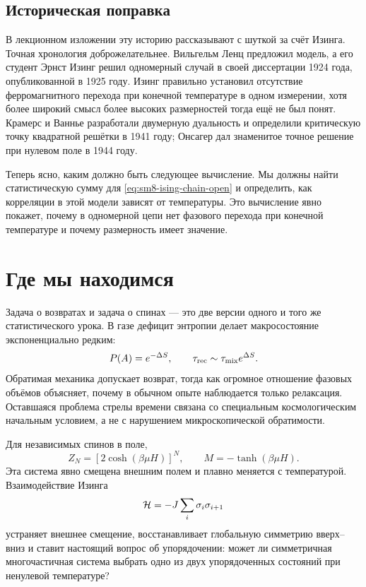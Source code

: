\subsection{Историческая поправка}

В лекционном изложении эту историю рассказывают с шуткой за счёт Изинга.
Точная хронология доброжелательнее. Вильгельм Ленц предложил модель, а его
студент Эрнст Изинг решил одномерный случай в своей диссертации 1924 года,
опубликованной в 1925 году. Изинг правильно установил отсутствие ферромагнитного
перехода при конечной температуре в одном измерении, хотя более широкий смысл
более высоких размерностей тогда ещё не был понят. Крамерс и Ваннье разработали
двумерную дуальность и определили критическую точку квадратной решётки
в 1941 году; Онсагер дал знаменитое точное решение при нулевом поле в 1944 году.

Теперь ясно, каким должно быть следующее вычисление. Мы должны найти статистическую сумму для
\eqref{eq:sm8-ising-chain-open} и определить, как корреляции в этой модели зависят от
температуры. Это вычисление явно покажет, почему в одномерной
цепи нет фазового перехода при конечной температуре и почему размерность
имеет значение.

\section{Где мы находимся}

Задача о возвратах и задача о спинах — это две версии одного и того же
статистического урока. В газе дефицит энтропии делает макросостояние
экспоненциально редким:
\begin{equation}
 P(A)=e^{-\Delta S},
 \qquad
 \tau_{\rm rec}\sim\tau_{\rm mix}e^{\Delta S}.
 \label{eq:sm8-summary-recurrence}
\end{equation}
Обратимая механика допускает возврат, тогда как огромное отношение фазовых
объёмов объясняет, почему в обычном опыте наблюдается только релаксация. Оставшаяся
проблема стрелы времени связана со специальным космологическим начальным условием, а не
с нарушением микроскопической обратимости.

Для независимых спинов в поле,
\begin{equation}
 Z_N=\left[2\cosh(\beta\mu H)\right]^N,
 \qquad
 M=-\tanh(\beta\mu H).
 \label{eq:sm8-summary-spins}
\end{equation}
Эта система явно смещена внешним полем и плавно меняется с температурой. Взаимодействие Изинга
\begin{equation}
 {\cal H}=-J\sum_i\sigma_i\sigma_{i+1}
 \label{eq:sm8-summary-ising}
\end{equation}
устраняет внешнее смещение, восстанавливает глобальную симметрию вверх--вниз и ставит
настоящий вопрос об упорядочении: может ли симметричная многочастичная система выбрать одно из
двух упорядоченных состояний при ненулевой температуре?
